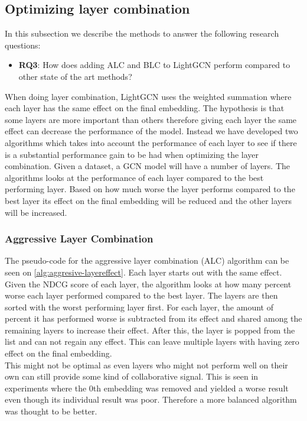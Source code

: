 \subsection{Optimizing layer combination}\label{fredsplit}

In this subsection we describe the methods to answer the following research questions:
\begin{itemize}
    \item \textbf{RQ3}: How does adding ALC and BLC to LightGCN perform compared to other state of the art methods?
\end{itemize}  

When doing layer combination, LightGCN uses the weighted summation where each layer has the same effect on the final embedding.
The hypothesis is that some layers are more important than others therefore giving each layer the same effect can decrease the performance of the model.
Instead we have developed two algorithms which takes into account the performance of each layer to see if there is a substantial performance gain to be had when optimizing the layer combination.
Given a dataset, a GCN model will have a number of layers.
The algorithms looks at the performance of each layer compared to the best performing layer.
Based on how much worse the layer performs compared to the best layer its effect on the final embedding will be reduced and the other layers will be increased.

\subsubsection{Aggressive Layer Combination}
The pseudo-code for the aggressive layer combination (ALC) algorithm can be seen on \autoref{alg:aggresive-layereffect}.
Each layer starts out with the same effect.
Given the NDCG score of each layer, the algorithm looks at how many percent worse each layer performed compared to the best layer.
The layers are then sorted with the worst performing layer first.
For each layer, the amount of percent it has performed worse is subtracted from its effect and shared among the remaining layers to increase their effect.
After this, the layer is popped from the list and can not regain any effect.
This can leave multiple layers with having zero effect on the final embedding.
\\
This might not be optimal as even layers who might not perform well on their own can still provide some kind of collaborative signal.
This is seen in experiments where the 0th embedding was removed and yielded a worse result even though its individual result was poor.
Therefore a more balanced algorithm was thought to be better.

